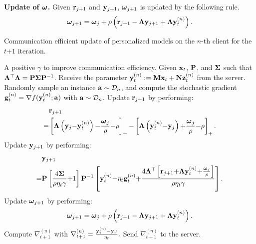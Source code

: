 \documentclass[journal]{IEEEtran}
\begin{document}
\textbf{Update of $\bomega$.} Given $\r_{j+1}$ and $\y_{j+1}$, $\bomega_{j+1}$ is updated by the following rule.
\begin{align}
\nonumber
\bomega_{j+1} = \bomega_j + \rho\lrincir{\r_{j+1} - \bLambda\y_{j+1} + \bLambda\y_t^{(n)}}.
\end{align}

\begin{algorithm}[!]
    \caption{Communication efficient update of personalized models on the $n$-th client for the $t\mathrm{+}1$ iteration.}
    \label{algo_efficient_update_nabla}
    \begin{algorithmic}[1]
        \Require A positive $\gamma$ to improve communication efficiency. Given $\x_t$, $\P$, and $\bSigma$ such that $\bLambda^\top\bLambda = \P\bSigma\P^{-1}$.
        \State Receive the parameter $\y_t^{(n)} := \M\x_t + \N\z_t^{(n)}$ from the server.
        \State Randomly sample an instance $\a\sim\Dcal_n$, and compute the stochastic gradient $\g^{(n)}_t = \nabla f(\y_t^{(n)};\a)$ with $\a\sim\Dcal_n$.
            \State Update $\r_{j+1}$ by performing:
            \begin{align}
            \nonumber
            & \r_{j+1} \\ \nonumber
            = & \left[\bLambda \lrincir{\y_j \mathrm{-} \y_t^{(n)}} \mathrm{-} \frac{\bomega_j}{\rho} \mathrm{-} \rho\right]_\mathrm{+}  \mathrm{-} \left[\bLambda \lrincir{\y_t^{(n)} \mathrm{-} \y_j} \mathrm{+} \frac{\bomega_j}{\rho} \mathrm{-} \rho\right]_\mathrm{+}.
            \end{align}
            \State Update $\y_{j+1}$ by performing:
            \begin{align}
	   \nonumber
	   & \y_{j+1} \\ \nonumber
	   = & \small \P\left[\frac{4\bSigma}{\rho\eta_t\gamma} \mathrm{+} 1\right]\P^{\mathrm{-1}}\left[\y_t^{(n)} \mathrm{-} \eta_t\g_t^{(n)}\mathrm{+}\frac{4\bLambda^\mathrm{\top}\left[\r_{j+1} \mathrm{+} \bLambda\y_t^{(n)} \mathrm{+} \frac{\bomega_j}{\rho}\right]}{\rho\eta_t\gamma}\right].
	   \end{align} 
           \State Update $\bomega_{j+1}$ by performing:
            $$\bomega_{j+1} = \bomega_j + \rho\lrincir{\r_{j+1} - \bLambda\y_{j+1} + \bLambda\y_t^{(n)}}.$$
            \EndFor
        \State Compute $\nabla_{t+1}^{(n)}$ with $\nabla_{t+1}^{(n)} = \frac{\y_t^{(n)} - \y_J}{\eta_t}.$
        \State Send $\nabla_{t+1}^{(n)}$ to the server.
      \end{algorithmic}
\end{algorithm}
\end{document}
